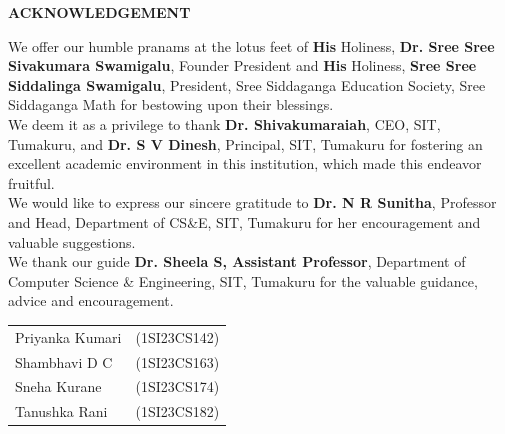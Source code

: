 \begin{titlepage}
\begin{center}
{\Large \textbf{ACKNOWLEDGEMENT}}
\end{center}

We offer our humble pranams at the lotus feet of \textbf{His} Holiness, \textbf{Dr. Sree Sree Sivakumara Swamigalu}, Founder President and \textbf{His} Holiness, \textbf{Sree Sree Siddalinga Swamigalu}, President, Sree Siddaganga Education Society, Sree Siddaganga Math for bestowing upon their blessings.\\

We deem it as a privilege to thank \textbf{Dr. Shivakumaraiah}, CEO, SIT, Tumakuru,  and \textbf{Dr. S V Dinesh}, Principal, SIT, Tumakuru for fostering an excellent academic environment in this institution, which made this endeavor fruitful.\\

We would like to express our sincere gratitude to \textbf{Dr. N R Sunitha}, Professor and Head, Department of CS\&E, SIT, Tumakuru for her encouragement and valuable suggestions.\\

We thank our guide \textbf{Dr. Sheela S, Assistant Professor},  Department of Computer Science \& Engineering, SIT, Tumakuru for the valuable guidance, advice and encouragement.\\


\begin{flushright}
\begin{tabular}{ll}
Priyanka Kumari & (1SI23CS142)  \\
Shambhavi D C & (1SI23CS163)  \\
Sneha Kurane & (1SI23CS174)  \\
Tanushka Rani & (1SI23CS182)  \\
\end{tabular}\\[1.5cm]
\end{flushright}
\end{titlepage}
